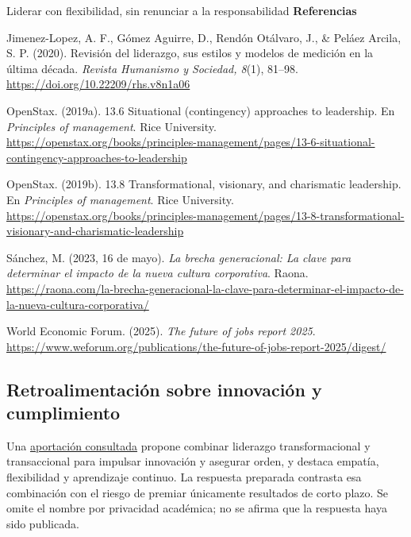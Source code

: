 \documentclass[11pt,letterpaper,oneside]{article}
\begin{document}
\begin{forobox}{Liderar con flexibilidad, sin renunciar a la responsabilidad}
\textbf{Referencias}\par
\begingroup\small
\hangindent=1.27cm Jimenez-Lopez, A. F., Gómez Aguirre, D., Rendón Otálvaro, J., \& Peláez Arcila, S. P. (2020). Revisión del liderazgo, sus estilos y modelos de medición en la última década. \textit{Revista Humanismo y Sociedad, 8}(1), 81--98. \url{https://doi.org/10.22209/rhs.v8n1a06}\par
\hangindent=1.27cm OpenStax. (2019a). 13.6 Situational (contingency) approaches to leadership. En \textit{Principles of management}. Rice University. \url{https://openstax.org/books/principles-management/pages/13-6-situational-contingency-approaches-to-leadership}\par
\hangindent=1.27cm OpenStax. (2019b). 13.8 Transformational, visionary, and charismatic leadership. En \textit{Principles of management}. Rice University. \url{https://openstax.org/books/principles-management/pages/13-8-transformational-visionary-and-charismatic-leadership}\par
\hangindent=1.27cm Sánchez, M. (2023, 16 de mayo). \textit{La brecha generacional: La clave para determinar el impacto de la nueva cultura corporativa}. Raona. \url{https://raona.com/la-brecha-generacional-la-clave-para-determinar-el-impacto-de-la-nueva-cultura-corporativa/}\par
\hangindent=1.27cm World Economic Forum. (2025). \textit{The future of jobs report 2025}. \url{https://www.weforum.org/publications/the-future-of-jobs-report-2025/digest/}\par
\endgroup
\end{forobox}

\clearpage
\subsection{Retroalimentación sobre innovación y cumplimiento}
Una \href{https://cursos3.e-itesca.edu.mx/mod/forum/discuss.php?d=757}{aportación consultada} propone combinar liderazgo transformacional y transaccional para impulsar innovación y asegurar orden, y destaca empatía, flexibilidad y aprendizaje continuo. La respuesta preparada contrasta esa combinación con el riesgo de premiar únicamente resultados de corto plazo. Se omite el nombre por privacidad académica; no se afirma que la respuesta haya sido publicada.
\end{document}
